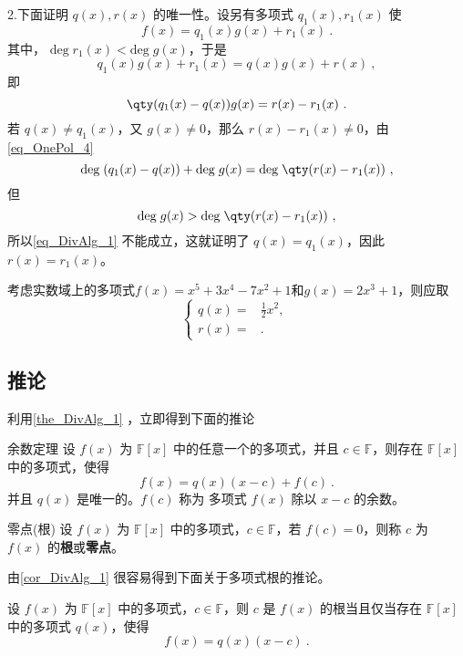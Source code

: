2.下面证明 $q(x),r(x)$ 的唯一性。设另有多项式 $q_1(x),r_1(x)$ 使
\begin{equation}
f(x)=q_1(x)g(x)+r_1(x)~.
\end{equation}
其中， $\mathrm{deg}\;r_1(x)<\mathrm{deg}\;g(x)$，于是
\begin{equation}
q_1(x)g(x)+r_1(x)=q(x)g(x)+r(x)~,
\end{equation}
即
\begin{equation}
\qty(q_1(x)-q(x))g(x)=r(x)-r_1(x)~.
\end{equation}
若 $q(x)\neq q_1(x)$，又 $g(x)\neq 0$，那么 $r(x)-r_1(x)\neq 0$，由\autoref{eq_OnePol_4}~
\begin{equation}\label{eq_DivAlg_1}
\mathrm{deg}\;(q_1(x)-q(x))+\mathrm{deg}\;g(x)=\mathrm{deg}\;\qty(r(x)-r_1(x))~,
\end{equation}
但
\begin{equation}
\mathrm{deg}\;g(x)>\mathrm{deg}\;\qty(r(x)-r_1(x))~,
\end{equation}
所以\autoref{eq_DivAlg_1} 不能成立，这就证明了
$q(x)=q_1(x)$，因此 $r(x)=r_1(x)$。





\begin{example}{}
考虑实数域上的多项式$f(x)=x^5+3x^4-7x^2+1$和$g(x)=2x^3+1$，则应取
\begin{equation}
\left\{
\begin{aligned}
q(x) ={}& \frac{1}{2}x^2 , \\
r(x) ={}&  . 
\end{aligned}
\right. ~
\end{equation}

\end{example}






\subsection{推论}
利用\autoref{the_DivAlg_1} ，立即得到下面的推论
\begin{corollary}{余数定理}\label{cor_DivAlg_1}
设 $f(x)$ 为 $\mathbb{F}[x]$ 中的任意一个的多项式，并且 $c\in\mathbb{F}$，则存在 $\mathbb{F}[x]$ 中的多项式，使得
\begin{equation}
f(x)=q(x)(x-c)+f(c)~.
\end{equation}
并且 $q(x)$ 是唯一的。$f(c)$ 称为 多项式 $f(x)$ 除以 $x-c$ 的余数。
\end{corollary}
\begin{definition}{零点(根)}
设 $f(x)$ 为 $\mathbb{F}[x]$ 中的多项式，$c\in\mathbb{F}$，若 $f(c)=0$，则称 $c$ 为 $f(x)$ 的\textbf{根}或\textbf{零点}。
\end{definition}
由\autoref{cor_DivAlg_1} 很容易得到下面关于多项式根的推论。
\begin{corollary}{}\label{cor_DivAlg_2}
设 $f(x)$ 为 $\mathbb{F}[x]$ 中的多项式，$c\in\mathbb{F}$，则 $c$ 是 $f(x)$ 的根当且仅当存在 $\mathbb{F}[x]$ 中的多项式 $q(x)$，使得
\begin{equation}
f(x)=q(x)(x-c)~.
\end{equation}

\end{corollary}

